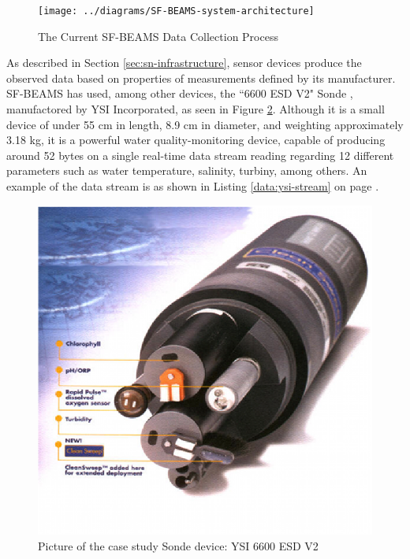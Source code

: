 \begin{figure}[!b]
  \centering
  \texttt{[image: ../diagrams/SF-BEAMS-system-architecture]}
  \caption{The Current SF-BEAMS Data Collection Process}
  \label{fig:SF-BEAMS-system-architecture}
\end{figure}

As described in Section \ref{sec:sn-infrastructure}, sensor devices produce
the observed data based on properties of measurements defined by its
manufacturer. SF-BEAMS has used, among other devices, the ``6600 ESD V2" Sonde
\cite{YSI-Sonde}, manufactored by YSI Incorporated, as seen in Figure
\ref{fig:ysi-device}. Although it is a small device of under 55 cm in length,
8.9 cm in diameter, and weighting approximately 3.18 kg, it is a powerful water
quality-monitoring device, capable of producing around 52 bytes on a single
real-time data stream reading regarding 12 different parameters such as water
temperature, salinity, turbiny, among others. An example of the data stream is
as shown in Listing \ref{data:ysi-stream} on page \pageref{data:ysi-stream}.

\begin{figure}[!b]
  \centering
  \includegraphics[scale=0.7]{../diagrams/ysi-device}
  \caption{Picture of the case study Sonde device: YSI 6600 ESD V2}
  \label{fig:ysi-device}
\end{figure}

